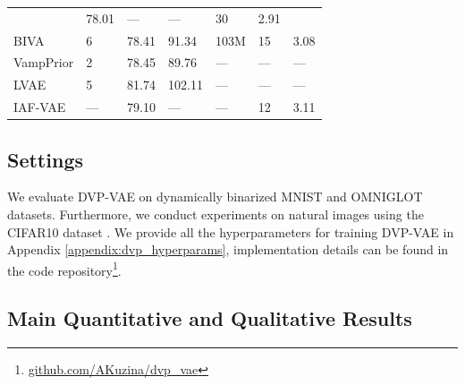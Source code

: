 \begin{table}[t]
{\begin{tabular}{l||lll|lll}
                    & \multirow{1}{*}{78.01} & \multirow{1}{*}{---} 
                    & --- & 30 & 2.91 \\
            BIVA\small{\citep{maaloe2019biva}}   & 6
                    & 78.41 & 91.34 & 103M & 15 & 3.08 \\
            VampPrior \small{\citep{tomczak2018vae}} & \multirow{1}{*}{2}
                    & \multirow{1}{*}{78.45}  &   \multirow{1}{*}{89.76}             
                    & --- & --- & --- \\
            LVAE \small{\citep{sonderby2016ladder}} & \multirow{1}{*}{5}
                    & \multirow{1}{*}{81.74} & \multirow{1}{*}{102.11}     
                    & --- & --- & --- \\
            IAF-VAE\small{\citep{kingma2016improved}} & \multirow{1}{*}{---}
                    & \multirow{1}{*}{79.10}  &   \multirow{1}{*}{---}             
                    & --- & 12 & 3.11 \\
            \bottomrule
        \end{tabular}%
        }
        \vskip 20pt
 \end{table} 
 

\subsection{Settings}
We evaluate DVP-VAE on dynamically binarized MNIST \citep{lecun1998mnist} and OMNIGLOT \citep{lake2015human} datasets. Furthermore, we conduct experiments on natural images using the CIFAR10 dataset \citep{Krizhevsky09learningmultiple}. We provide all the hyperparameters for training DVP-VAE in Appendix \ref{appendix:dvp_hyperparams}, implementation details can be found in the code repository\footnote{\url{github.com/AKuzina/dvp_vae}}.
\subsection{Main Quantitative and Qualitative Results}\label{sect:exp_image_generations}


